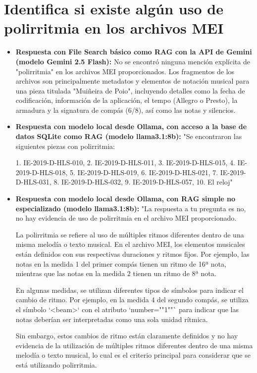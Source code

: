 \section{Identifica si existe algún uso de polirritmia en los archivos MEI}
\begin{itemize}
    \item \textbf{Respuesta con File Search básico como RAG con la API de Gemini (modelo Gemini 2.5 Flash):} No se encontró ninguna mención explícita de "polirritmia" en los archivos MEI proporcionados. Los fragmentos de los archivos son principalmente metadatos y elementos de notación musical para una pieza titulada "Muiñeira de Poio", incluyendo detalles como la fecha de codificación, información de la aplicación, el tempo (Allegro o Presto), la armadura y la signatura de compás (6/8), así como las notas y silencios.
    \item \textbf{Respuesta con modelo local desde Ollama, con acceso a la base de datos SQLite como RAG (modelo llama3.1:8b):} "Se encontraron las siguientes piezas con polirritmia:

1. IE-2019-D-HLS-010,
2. IE-2019-D-HLS-011,
3. IE-2019-D-HLS-015,
4. IE-2019-D-HLS-018,
5. IE-2019-D-HLS-019,
6. IE-2019-D-HLS-021,
7. IE-2019-D-HLS-031,
8. IE-2019-D-HLS-032,
9. IE-2019-D-HLS-057,
10. El reloj"
\item \textbf{Respuesta con modelo local desde Ollama, con RAG simple no especializado (modelo llama3.1:8b):} "La respuesta a tu pregunta es no, no hay evidencia de uso de polirritmia en el archivo MEI proporcionado.

La polirritmia se refiere al uso de múltiples ritmos diferentes dentro de una misma melodía o texto musical. En el archivo MEI, los elementos musicales están definidos con sus respectivas duraciones y ritmos fijos. Por ejemplo, las notas en la medida 1 del primer compás tienen un ritmo de 16ª nota, mientras que las notas en la medida 2 tienen un ritmo de 8ª nota.

En algunas medidas, se utilizan diferentes tipos de símbolos para indicar el cambio de ritmo. Por ejemplo, en la medida 4 del segundo compás, se utiliza el símbolo `<beam>` con el atributo `number=""1""` para indicar que las notas deberían ser interpretadas como una sola unidad rítmica.

Sin embargo, estos cambios de ritmo están claramente definidos y no hay evidencia de la utilización de múltiples ritmos diferentes dentro de una misma melodía o texto musical, lo cual es el criterio principal para considerar que se está utilizando polirritmia.


\end{itemize}
